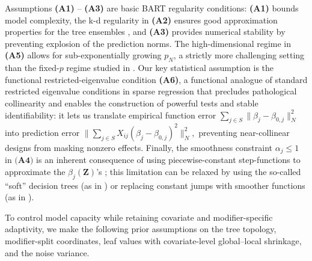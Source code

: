 \documentclass[11pt]{article}
\newcommand{\bZ}{\bm{Z}}
\theoremstyle{plain}
\theoremstyle{definition}
\theoremstyle{plain}
\begin{document}
Assumptions \textbf{(A1)} -- \textbf{(A3)} are basic BART regularity conditions: \textbf{(A1)} bounds model complexity, the k-d regularity in \textbf{(A2)} ensures good approximation properties for the tree ensembles \citep{Rockova2019}, and \textbf{(A3)} provides numerical stability by preventing explosion of the prediction norms. 
The high-dimensional regime in \textbf{(A5)} allows for sub-exponentially growing $p_N$, a strictly more challenging setting than the fixed-$p$ regime studied in \citet{Deshpande2024}. 
Our key statistical assumption is the functional restricted-eigenvalue condition \textbf{(A6)}, a functional analogue of standard restricted eigenvalue conditions in sparse regression \citep[\S3]{Bickel_2009} that precludes pathological collinearity and enables the construction of powerful tests and stable identifiability: it lets us translate empirical function error $\sum_{j \in S}\|\beta_j-\beta_{0,j}\|_N ^2$ into prediction error $\|\sum_{j \in S} X_{ij}(\beta_j - \beta_{0,j})^2 \|_N ^2,$ preventing near-collinear designs from masking nonzero effects. 
Finally, the smoothness constraint $\alpha_j \le 1$ in $\textbf{(A4)}$ is an inherent consequence of using piecewise-constant step-functions to approximate the $\beta_{j}(\bZ)$'s \citep{jeong2023artbartminimaxoptimality}; this limitation can be relaxed by using the so-called ``soft'' decision trees (as in \citet{LineroYang2018}) or replacing constant jumps with smoother functions (as in \citet{yee2025scalablepiecewisesmoothingbart}).

To control model capacity while retaining covariate and modifier-specific adaptivity, we make the following prior assumptions on the tree topology, modifier-split coordinates, leaf values with covariate-level global–local shrinkage, and the noise variance. 
\end{document}
